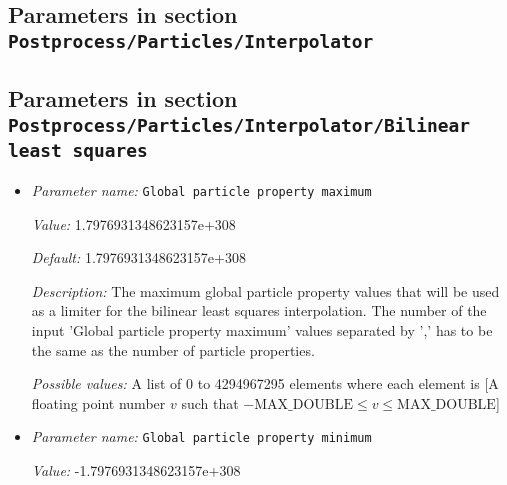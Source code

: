 \subsection{Parameters in section \tt Postprocess/Particles/Interpolator}
\label{parameters:Postprocess/Particles/Interpolator}


\subsection{Parameters in section \tt Postprocess/Particles/Interpolator/Bilinear least squares}
\label{parameters:Postprocess/Particles/Interpolator/Bilinear_20least_20squares}

\begin{itemize}
\item {\it Parameter name:} {\tt Global particle property maximum}
\label{parameters:Postprocess/Particles/Interpolator/Bilinear least squares/Global particle property maximum}
\label{parameters:Postprocess/Particles/Interpolator/Bilinear_20least_20squares/Global_20particle_20property_20maximum}


{\it Value:} 1.7976931348623157e+308


{\it Default:} 1.7976931348623157e+308


{\it Description:} The maximum global particle property values that will be used as a limiter for the bilinear least squares interpolation. The number of the input 'Global particle property maximum' values separated by ',' has to be the same as the number of particle properties.


{\it Possible values:} A list of 0 to 4294967295 elements where each element is [A floating point number $v$ such that $-\text{MAX\_DOUBLE} \leq v \leq \text{MAX\_DOUBLE}$]
\item {\it Parameter name:} {\tt Global particle property minimum}
\label{parameters:Postprocess/Particles/Interpolator/Bilinear least squares/Global particle property minimum}
\label{parameters:Postprocess/Particles/Interpolator/Bilinear_20least_20squares/Global_20particle_20property_20minimum}


{\it Value:} -1.7976931348623157e+308



\end{itemize}
